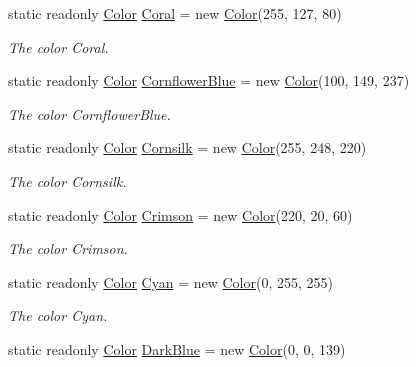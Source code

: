 \begin{DoxyCompactItemize}
static readonly \hyperlink{struct_tri_devs_1_1_tri_engine_1_1_color}{Color} \hyperlink{struct_tri_devs_1_1_tri_engine_1_1_color_a9869f5d817a1f38ba5e503950e906ba8}{Coral} = new \hyperlink{struct_tri_devs_1_1_tri_engine_1_1_color}{Color}(255, 127, 80)
\begin{DoxyCompactList}\small\item\em The color Coral. \end{DoxyCompactList}\item 
static readonly \hyperlink{struct_tri_devs_1_1_tri_engine_1_1_color}{Color} \hyperlink{struct_tri_devs_1_1_tri_engine_1_1_color_a5109776f06564614216e7f23e5e54cbb}{Cornflower\-Blue} = new \hyperlink{struct_tri_devs_1_1_tri_engine_1_1_color}{Color}(100, 149, 237)
\begin{DoxyCompactList}\small\item\em The color Cornflower\-Blue. \end{DoxyCompactList}\item 
static readonly \hyperlink{struct_tri_devs_1_1_tri_engine_1_1_color}{Color} \hyperlink{struct_tri_devs_1_1_tri_engine_1_1_color_a05731599f062bccc602befb6a15ee386}{Cornsilk} = new \hyperlink{struct_tri_devs_1_1_tri_engine_1_1_color}{Color}(255, 248, 220)
\begin{DoxyCompactList}\small\item\em The color Cornsilk. \end{DoxyCompactList}\item 
static readonly \hyperlink{struct_tri_devs_1_1_tri_engine_1_1_color}{Color} \hyperlink{struct_tri_devs_1_1_tri_engine_1_1_color_a205300443e24e68b31568725be77d5e0}{Crimson} = new \hyperlink{struct_tri_devs_1_1_tri_engine_1_1_color}{Color}(220, 20, 60)
\begin{DoxyCompactList}\small\item\em The color Crimson. \end{DoxyCompactList}\item 
static readonly \hyperlink{struct_tri_devs_1_1_tri_engine_1_1_color}{Color} \hyperlink{struct_tri_devs_1_1_tri_engine_1_1_color_a3b08cc47230c10ec9f8fedd58f7d6d73}{Cyan} = new \hyperlink{struct_tri_devs_1_1_tri_engine_1_1_color}{Color}(0, 255, 255)
\begin{DoxyCompactList}\small\item\em The color Cyan. \end{DoxyCompactList}\item 
static readonly \hyperlink{struct_tri_devs_1_1_tri_engine_1_1_color}{Color} \hyperlink{struct_tri_devs_1_1_tri_engine_1_1_color_af6d7f220e558723f6f9685e09ade41f9}{Dark\-Blue} = new \hyperlink{struct_tri_devs_1_1_tri_engine_1_1_color}{Color}(0, 0, 139)

\end{DoxyCompactItemize}
